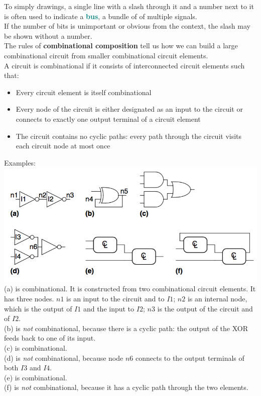 \documentclass[12pt]{article}
\theoremstyle{definition}
\newcommand{\defnterm}[1]{\textbf{\textcolor{teal}{#1}}\index{#1}}
\begin{document}
  To simply drawings, a single line with a slash through it and a number next to it is often used to indicate a \defnterm{bus}, a bundle of of multiple signals. \\
  If the number of bits is unimportant or obvious from the context, the slash may be shown without a number. \\

  The rules of \textbf{combinational composition} tell us how we can build a large combinational circuit from smaller combinational circuit elements. \\
  A circuit is combinational if it consists of interconnected circuit elements such that:
  \begin{itemize}
    \item Every circuit element is itself combinational
    \item Every node of the circuit is either designated as an input to the circuit or connects to exactly one output terminal of a circuit element
    \item The circuit contains no cyclic paths: every path through the circuit visits each circuit node at most once
  \end{itemize}

  Examples: \\
  \includegraphics[width=1.0\textwidth]{pictures/combinationalCircuitExample.png}
  (a) is combinational. It is constructed from two combinational circuit elements. It has three nodes. $n1$ is an input to the circuit and to $I1$; $n2$ is an internal node, which is the output of $I1$ and the input to $I2$; $n3$ is the output of the circuit and of $I2$. \\
  (b) is \emph{not} combinational, because there is a cyclic path: the output of the XOR feeds back to one of its input. \\
  (c) is combinational. \\
  (d) is \emph{not} combinational, because node $n6$ connects to the output terminals of both $I3$ and $I4$. \\
  (e) is combinational. \\
  (f) is \emph{not} combinational, because it has a cyclic path through the two elements. \\
\end{document}
